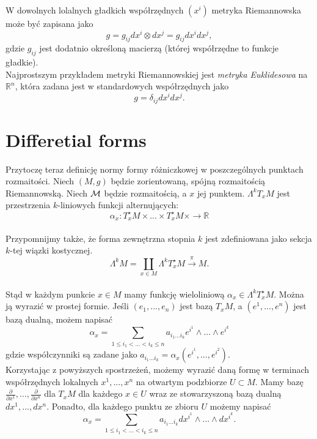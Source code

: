 \documentclass[licencjacka]{pracamgr}
\theoremstyle{definition}
\theoremstyle{definition}
\theoremstyle{plain}
\theoremstyle{plain}
\def\M{\ensuremath\mathcal{M}}
\begin{document}
W dowolnych lolalnych gładkich współrzędnych $(x^i)$ metryka Riemannowska
może być zapisana jako
\[
    g = g_{ij} dx^i \otimes dx^j = g_{ij} dx^i dx^j,
\]
gdzie
$g_{ij}$
jest dodatnio określoną macierzą (której współrzędne to funkcje gładkie). \\

Najprostszym przykładem metryki Riemannowskiej jest \emph{metryka Euklidesowa}
na $\mathbb{R}^n$, która zadana jest w standardowych współrzędnych jako
\[
    g = \delta_{ij}dx^idx^j.
\]



\section{Differetial forms}

Przytoczę teraz definicję normy formy różniczkowej w poszczególnych punktach
rozmaitości. Niech $(M, g)$ będzie zorientowaną, spójną %
rozmaitością Riemannowską. Niech $\M$ będzie rozmaitością, a $x$ jej punktem.
$\Lambda^k T_x M$ jest przestrzenia $k$-liniowych funkcji alternujących:
\[
    \alpha_x:T_x^\star M \times ... \times T_x^\star M \times \rightarrow \mathbb{R}
\] \\

Przypomnijmy także, że forma zewnętrzna stopnia $k$ jest zdefiniowana jako 
sekcja $k$-tej wiązki kostycznej.
\[
    \Lambda^k M = \coprod_{x \in M} 
    \Lambda^k T_x^\star M \xrightarrow{\pi} M.
\] \\

Stąd w każdym punkcie $x \in M$ mamy funkcję wieloliniową $\alpha_x \in
\Lambda^k T_x^\star M$. Można ją wyrazić w prostej formie.
Jeśli $(e_1, ..., e_n)$ jest bazą $T_x M$, a  $(e^1, ..., e^n)$ jest bazą dualną,
możem napisać
\[
    \alpha_x = \sum_{1 \leq i_1 < ... < i_k \leq n} a_{i_1 ... i_k} e^{i^1} \wedge ...
    \wedge e^{i^k}
\] 
gdzie współczynniki są zadane jako
$a_{i_1 ... i_k} = \alpha_x(e^{i^1}, ..., e^{i^2})$. \\

Korzystając z powyższych spostrzeżeń, możemy wyrazić daną formę w terminach
współrzędnych lokalnych $x^1, ..., x^n$
na otwartym podzbiorze $U \subset M$.  Mamy bazę
$\frac{\partial}{\partial x^1}, ..., \frac{\partial}{\partial x^n}$ dla $T_x M$
dla każdego $x \in U$ wraz ze stowarzyszoną bazą dualną $dx^1, ..., dx^n$.
Ponadto, dla każdego punktu ze zbioru $U$ możemy napisać
\[
    \alpha_x = \sum_{1 \leq i_1 < ... < i_k \leq n} a_{i_1 ... i_k}
       dx^{i^1} \wedge ...  \wedge dx^{i^k}.
\]  \\
\end{document}
